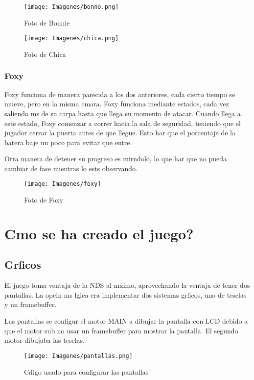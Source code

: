 \documentclass[12pt]{article}
\begin{document}
      \begin{figure}[!h]
        \begin{minipage}[c]{0.4\linewidth}
          \centering
          \texttt{[image: Imagenes/bonno.png]}
          \caption{Foto de Bonnie}
        \end{minipage}\:
        \begin{minipage}[c]{0.4\linewidth}
          \centering
          \texttt{[image: Imagenes/chica.png]}
          \caption{Foto de Chica}
        \end{minipage}\:
      \end{figure}


    \subsubsection{Foxy}
      Foxy funciona de manera parecida a los dos anteriores, cada cierto tiempo se mueve, pero en la misma cmara. Foxy funciona mediante estados, cada vez saliendo ms de su carpa hasta que llega su momento de atacar. Cuando llega a este estado, Foxy comenzar a correr hacia la sala de seguridad, teniendo que el jugador cerrar la puerta antes de que llegue.
      Esto har que el porcentaje de la batera baje un poco para evitar que entre.

      Otra manera de detener su progreso es mirndolo, lo que har que no pueda cambiar de fase mientras lo ests observando.
        \begin{figure}[H]
          \centering
          \texttt{[image: Imagenes/foxy]}
          \caption{Foto de Foxy}
          \label{fig:foxy}
        \end{figure}

\newpage
\section{Cmo se ha creado el juego? \label{how}}
  \subsection{Grficos}
    El juego toma ventaja de la NDS al mximo, aprovechando la ventaja de tener dos pantallas.
    La opcin ms lgica era implementar dos sistemas grficos, uno de teselas y un framebuffer.

    Las pantallas se configur el motor MAIN a dibujar la pantalla con LCD debido a que el motor sub no usar un framebuffer para mostrar la pantalla. El segundo motor dibujaba las teselas.
    \begin{figure}[H]
      \centering
      \texttt{[image: Imagenes/pantallas.png]}
      \caption{Cdigo usado para configurar las pantallas}
      \label{fig:screen}
    \end{figure}
\end{document}
